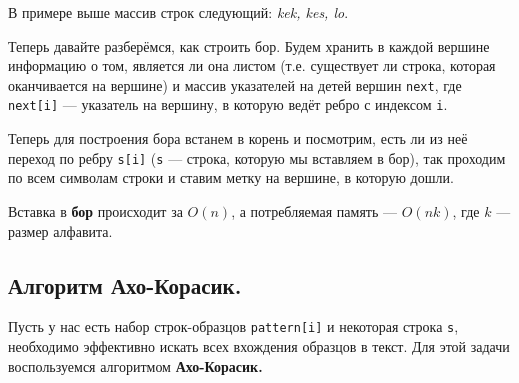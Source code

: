 В примере выше массив строк следующий:  \textit{kek, kes, lo}.

Теперь давайте разберёмся, как строить бор. Будем хранить в каждой вершине информацию о том, является ли
она листом (т.е. существует ли строка, которая оканчивается на вершине) и массив указателей на детей вершин
\texttt{next}, где \texttt{next[i]} --- указатель на вершину, в которую ведёт ребро с индексом
\texttt{i}.

Теперь для построения бора встанем в корень и посмотрим, есть ли из неё переход по ребру \texttt{s[i]}
(\texttt{s} --- строка, которую мы вставляем в бор), так проходим по всем символам строки и ставим
метку на вершине, в которую дошли.

\begin{remark}
  Вставка в \textbf{бор} происходит за $O(n)$, а потребляемая память --- $O(nk)$, где  $k$ --- размер алфавита.
\end{remark}

\subsection{Алгоритм Ахо-Корасик.}

Пусть у нас есть набор строк-образцов \texttt{pattern[i]} и некоторая строка \texttt{s},
необходимо эффективно искать всех вхождения образцов в текст. Для этой задачи воспользуемся алгоритмом
\textbf{Ахо-Корасик.}

